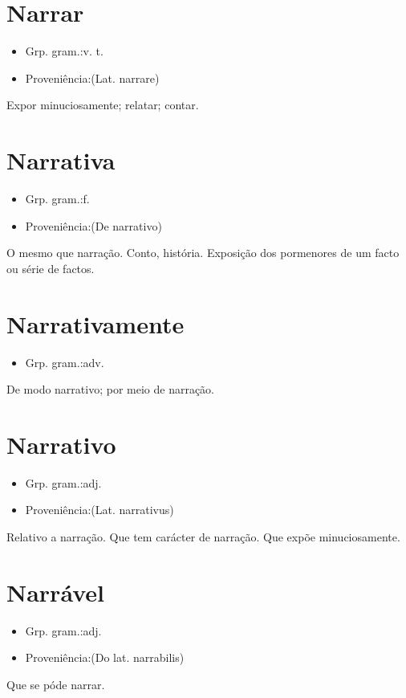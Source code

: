 \section{Narrar}
\begin{itemize}
\item {Grp. gram.:v. t.}
\end{itemize}
\begin{itemize}
\item {Proveniência:(Lat. \textunderscore narrare\textunderscore )}
\end{itemize}
Expor minuciosamente; relatar; contar.
\section{Narrativa}
\begin{itemize}
\item {Grp. gram.:f.}
\end{itemize}
\begin{itemize}
\item {Proveniência:(De \textunderscore narrativo\textunderscore )}
\end{itemize}
O mesmo que \textunderscore narração\textunderscore .
Conto, história.
Exposição dos pormenores de um facto ou série de factos.
\section{Narrativamente}
\begin{itemize}
\item {Grp. gram.:adv.}
\end{itemize}
De modo narrativo; por meio de narração.
\section{Narrativo}
\begin{itemize}
\item {Grp. gram.:adj.}
\end{itemize}
\begin{itemize}
\item {Proveniência:(Lat. \textunderscore narrativus\textunderscore )}
\end{itemize}
Relativo a narração.
Que tem carácter de narração.
Que expõe minuciosamente.
\section{Narrável}
\begin{itemize}
\item {Grp. gram.:adj.}
\end{itemize}
\begin{itemize}
\item {Proveniência:(Do lat. \textunderscore narrabilis\textunderscore )}
\end{itemize}
Que se póde narrar.
